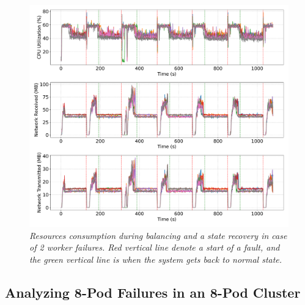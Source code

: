\begin{figure}[ht]
    \centering
    \includegraphics[width=1\textwidth]{figures/flink-2pods/flink_2_pods_resources}
    \caption{\textit{Resources consumption during balancing and a state recovery in case of 2 worker failures.
    Red vertical line denote a start of a fault, and the green vertical line is when the system gets back to normal state.}}
    \label{fig:flink-2pods-resource}
\end{figure}


\newpage
\subsection{Analyzing 8-Pod Failures in an 8-Pod Cluster}\label{subsec:analyzing-8-pod-failures-in-an-8-pod-cluster2}


